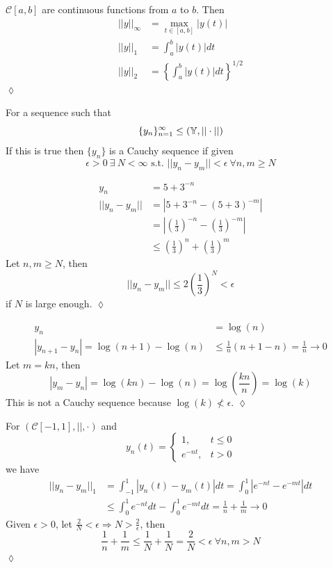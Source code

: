 \documentclass[lecture,12pt,]{pcms-l}
\begin{document}
\begin{example}
$\mathcal{C}[a,b]$ are continuous functions from $a$ to $b$. Then
\begin{align*}
||y||_\infty &= \max_{t\in[a,b]}|y(t)| \\
||y||_1 &= \int_a^b|y(t)|dt \\
||y||_2 &= \left\lbrace\int_a^b|y(t)|dt\right\rbrace^{1/2}
\end{align*}
$\lozenge$
\end{example}

\begin{definition}
For a sequence such that
$$\{y_n\}_{n=1}^\infty \leq (\mathbb{Y},||\cdot||)$$
If this is true then $\{y_n\}$ is a Cauchy sequence if given
$$\epsilon>0 ~\exists ~N<\infty \text{ s.t. } ||y_n-y_m||<\epsilon ~\forall n,m\geq N$$
\end{definition}

\begin{example}
\begin{align*}
y_n &= 5+3^{-n} \\
||y_n-y_m|| &= |5+3^{-n}-(5+3)^{-m}| \\
&= \left|\left(\frac{1}{3}\right)^{-n} - \left(\frac{1}{3}\right)^{-m}\right| \\
&\leq \left(\frac{1}{3}\right)^n + \left(\frac{1}{3}\right)^m
\end{align*}
Let $n,m\geq N$, then
$$||y_n-y_m|| \leq 2\left(\frac{1}{3}\right)^N < \epsilon$$
if $N$ is large enough.
$\lozenge$
\end{example}

\begin{example}
\begin{align*}
y_n &= \log(n) \\
|y_{n+1}-y_n| = \log(n+1)-\log(n) &\leq \frac{1}{n}(n+1-n) = \frac{1}{n}\to 0
\end{align*}
Let $m=kn$, then
$$|y_m-y_n| = \log(kn)-\log(n) = \log\left(\frac{kn}{n}\right) = \log(k)$$
This is not a Cauchy sequence because $\log(k)\nless\epsilon$.
$\lozenge$
\end{example}

\begin{example}
\label{ex:1norm}
For $(\mathcal{C}[-1,1],||,\cdot)$ and
$$y_n(t) = \begin{cases} 1, & t\leq 0 \\ e^{-nt}, & t>0 \end{cases}$$
we have
\begin{align*}
||y_n-y_m||_1 &= \int_{-1}^1|y_n(t)-y_m(t)|dt = \int_0^1|e^{-nt}-e^{-mt}|dt \\
&\leq \int_0^1e^{-nt}dt - \int_0^1e^{-mt}dt = \frac{1}{n} + \frac{1}{m} \to 0
\end{align*}
Given $\epsilon>0$, let $\frac{2}{N}<\epsilon\Rightarrow N>\frac{2}{\epsilon}$, then
$$\frac{1}{n} + \frac{1}{m}\leq \frac{1}{N}+\frac{1}{N} = \frac{2}{N}<\epsilon ~\forall n,m>N$$
$\lozenge$
\end{example}
\end{document}
